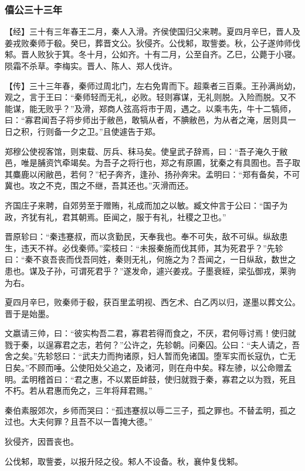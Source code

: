 \documentclass[]{article}
\begin{document}
\hypertarget{header-n1027}{%
\subsubsection{僖公三十三年}\label{header-n1027}}

【经】三十有三年春王二月，秦人入滑。齐侯使国归父来聘。夏四月辛巳，晋人及姜戎败秦师于殽。癸巳，葬晋文公。狄侵齐。公伐邾，取訾娄。秋，公子遂帅师伐邾。晋人败狄于箕。冬十月，公如齐。十有二月，公至自齐。乙巳，公薨于小寝。陨霜不杀草。李梅实。晋人、陈人、郑人伐许。

【传】三十三年春，秦师过周北门，左右免胄而下。超乘者三百乘。王孙满尚幼，观之，言于王曰：``秦师轻而无礼，必败。轻则寡谋，无礼则脱。入险而脱。又不能谋，能无败乎？''及滑，郑商人弦高将市于周，遇之。以乘韦先，牛十二犒师，曰：``寡君闻吾子将步师出于敝邑，敢犒从者，不腆敝邑，为从者之淹，居则具一日之积，行则备一夕之卫。''且使遽告于郑。

郑穆公使视客馆，则束载、厉兵、秣马矣。使皇武子辞焉，曰：``吾子淹久于敝邑，唯是脯资饩牵竭矣。为吾子之将行也，郑之有原圃，犹秦之有具囿也。吾子取其麋鹿以闲敝邑，若何？''杞子奔齐，逢孙、扬孙奔宋。孟明曰：``郑有备矣，不可冀也。攻之不克，围之不继，吾其还也。''灭滑而还。

齐国庄子来聘，自郊劳至于赠贿，礼成而加之以敏。臧文仲言于公曰：``国子为政，齐犹有礼，君其朝焉。臣闻之，服于有礼，社稷之卫也。''

晋原轸曰：``秦违蹇叔，而以贪勤民，天奉我也。奉不可失，敌不可纵。纵敌患生，违天不祥。必伐秦师。''栾枝曰：``未报秦施而伐其师，其为死君乎？''先轸曰：``秦不哀吾丧而伐吾同姓，秦则无礼，何施之为？吾闻之，一日纵敌，数世之患也。谋及子孙，可谓死君乎？''遂发命，遽兴姜戎。子墨衰絰，梁弘御戎，莱驹为右。

夏四月辛巳，败秦师于殽，获百里孟明视、西乞术、白乙丙以归，遂墨以葬文公。晋于是始墨。

文嬴请三帅，曰：``彼实构吾二君，寡君若得而食之，不厌，君何辱讨焉！使归就戮于秦，以逞寡君之志，若何？''公许之，先轸朝。问秦囚。公曰：``夫人请之，吾舍之矣。''先轸怒曰：``武夫力而拘诸原，妇人暂而免诸国。堕军实而长寇仇，亡无日矣。''不顾而唾。公使阳处父追之，及诸河，则在舟中矣。释左骖，以公命赠孟明。孟明稽首曰：``君之惠，不以累臣衅鼓，使归就戮于秦，寡君之以为戮，死且不朽。若从君惠而免之，三年将拜君赐。''

秦伯素服郊次，乡师而哭曰：``孤违蹇叔以辱二三子，孤之罪也。不替孟明，孤之过也。大夫何罪？且吾不以一眚掩大德。''

狄侵齐，因晋丧也。

公伐邾，取訾娄，以报升陉之役。邾人不设备。秋，襄仲复伐邾。
\end{document}
